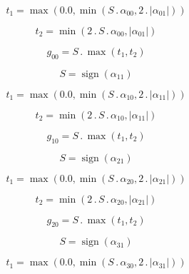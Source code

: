 \documentclass{article}
\begin{document}
\begin{dmath}t_{1} = \max\left(0.0, \min\left(S \,.\, \alpha_{00}, 2 \,.\, \left|{\alpha_{01}}\right|\right)\right)\end{dmath}

\begin{dmath}t_{2} = \min\left(2 \,.\, S \,.\, \alpha_{00}, \left|{\alpha_{01}}\right|\right)\end{dmath}

\begin{dmath}g_{00} = S \,.\, \max\left(t_{1}, t_{2}\right)\end{dmath}

\begin{dmath}S = \operatorname{sign}{\left (\alpha_{11} \right )}\end{dmath}

\begin{dmath}t_{1} = \max\left(0.0, \min\left(S \,.\, \alpha_{10}, 2 \,.\, \left|{\alpha_{11}}\right|\right)\right)\end{dmath}

\begin{dmath}t_{2} = \min\left(2 \,.\, S \,.\, \alpha_{10}, \left|{\alpha_{11}}\right|\right)\end{dmath}

\begin{dmath}g_{10} = S \,.\, \max\left(t_{1}, t_{2}\right)\end{dmath}

\begin{dmath}S = \operatorname{sign}{\left (\alpha_{21} \right )}\end{dmath}

\begin{dmath}t_{1} = \max\left(0.0, \min\left(S \,.\, \alpha_{20}, 2 \,.\, \left|{\alpha_{21}}\right|\right)\right)\end{dmath}

\begin{dmath}t_{2} = \min\left(2 \,.\, S \,.\, \alpha_{20}, \left|{\alpha_{21}}\right|\right)\end{dmath}

\begin{dmath}g_{20} = S \,.\, \max\left(t_{1}, t_{2}\right)\end{dmath}

\begin{dmath}S = \operatorname{sign}{\left (\alpha_{31} \right )}\end{dmath}

\begin{dmath}t_{1} = \max\left(0.0, \min\left(S \,.\, \alpha_{30}, 2 \,.\, \left|{\alpha_{31}}\right|\right)\right)\end{dmath}
\end{document}
